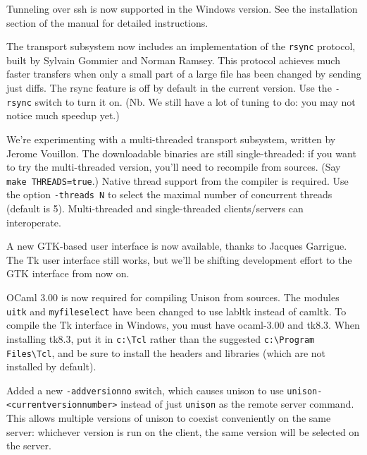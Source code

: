 \begin{changesfromversion}{1.231}
\item Tunneling over ssh is now supported in the Windows version.  See
the installation section of the manual for detailed instructions.

\item The transport subsystem now includes an implementation of the
\verb|rsync| protocol, built by Sylvain Gommier and Norman Ramsey.
This protocol achieves much faster transfers when only a small part of
a large file has been changed by sending just diffs.  The rsync
feature is off by default in the current version.  Use the
\verb|-rsync| switch to turn it on.  (Nb.  We still have a lot of
tuning to do: you may not notice much speedup yet.)

\item We're experimenting with a multi-threaded transport subsystem,
written by Jerome Vouillon.  The downloadable binaries are still
single-threaded: if you want to try the multi-threaded version, you'll
need to recompile from sources.  (Say \verb|make THREADS=true|.)
Native thread support from the compiler is required.  Use the option
\verb|-threads N| to select the maximal number of concurrent 
threads (default is 5).  Multi-threaded
and single-threaded clients/servers can interoperate.  

\item A new GTK-based user interface is now available, thanks to
Jacques Garrigue.  The Tk user interface still works, but we'll be
shifting development effort to the GTK interface from now on.
\item OCaml 3.00 is now required for compiling Unison from sources.
The modules \verb|uitk| and \verb|myfileselect| have been changed to
use labltk instead of camltk.  To compile the Tk interface in Windows,
you must have ocaml-3.00 and tk8.3.  When installing tk8.3, put it in
\verb|c:\Tcl| rather than the suggested \verb|c:\Program Files\Tcl|, 
and be sure to install the headers and libraries (which are not 
installed by default).

\item Added a new \verb|-addversionno| switch, which causes unison to
use \verb|unison-<currentversionnumber>| instead of just \verb|unison|
as the remote server command.  This allows multiple versions of unison
to coexist conveniently on the same server: whichever version is run
on the client, the same version will be selected on the server.
\end{changesfromversion}

